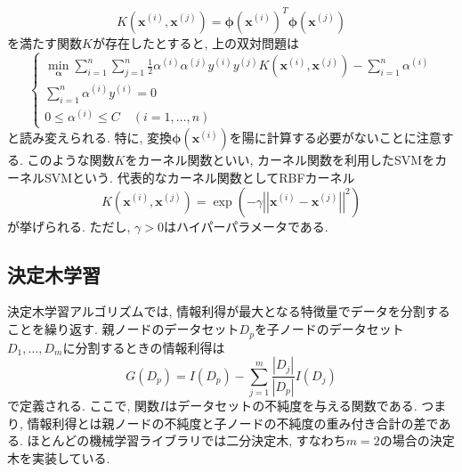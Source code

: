 \documentclass[uplatex]{jsarticle}
\theoremstyle{definition}
\numberwithin{equation}{section}
\newcommand{\norm}[1]{\left|\left|#1\right|\right|}
\begin{document}
\begin{equation}
    K(\bm{x}^{(i)}, \bm{x}^{(j)}) = \bm{\phi}(\bm{x}^{(i)})^{T}\bm{\phi}(\bm{x}^{(j)})
\end{equation}
を満たす関数$K$が存在したとすると, 上の双対問題は
\begin{equation}
    \left\{
        \begin{aligned}
            \min_{\bm{\alpha}} \sum_{i = 1}^{n} \sum_{j = 1}^{n} \frac{1}{2}\alpha^{(i)}\alpha^{(j)}y^{(i)}y^{(j)}K(\bm{x}^{(i)}, \bm{x}^{(j)}) - \sum_{i = 1}^{n} \alpha^{(i)} \\
            \sum_{i = 1}^{n} \alpha^{(i)}y^{(i)} = 0 \\
            0 \leq \alpha^{(i)} \leq C \quad (i = 1, \dots, n)
        \end{aligned}
    \right.
\end{equation}
と読み変えられる.
特に, 変換$\bm{\phi}(\bm{x}^{(i)})$を陽に計算する必要がないことに注意する.
このような関数$K$をカーネル関数といい, カーネル関数を利用したSVMをカーネルSVMという.
代表的なカーネル関数としてRBFカーネル
\begin{equation}
    K(\bm{x}^{(i)}, \bm{x}^{(j)}) = \exp\left(-\gamma\norm{\bm{x}^{(i)} - \bm{x}^{(j)}}^{2}\right)
\end{equation}
が挙げられる.
ただし, $\gamma > 0$はハイパーパラメータである.

\subsection{決定木学習}
決定木学習アルゴリズムでは, 情報利得が最大となる特徴量でデータを分割することを繰り返す.
親ノードのデータセット$D_{p}$を子ノードのデータセット$D_{1}, \dots, D_{m}$に分割するときの情報利得は
\begin{equation}
    G(D_{p}) = I(D_{p}) - \sum_{j = 1}^{m} \frac{|D_{j}|}{|D_{p}|}I(D_{j})
\end{equation}
で定義される.
ここで, 関数$I$はデータセットの不純度を与える関数である.
つまり, 情報利得とは親ノードの不純度と子ノードの不純度の重み付き合計の差である.
ほとんどの機械学習ライブラリでは二分決定木, すなわち$m = 2$の場合の決定木を実装している.
\end{document}
